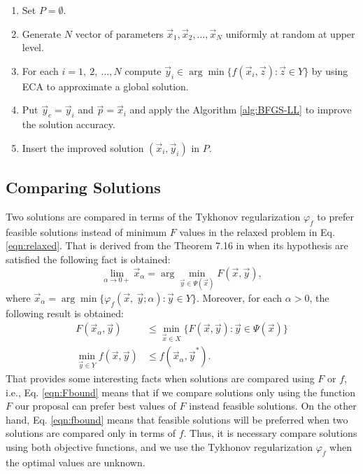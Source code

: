 \documentclass[conference]{IEEEtran}
\theoremstyle{definition}
\begin{document}
\begin{enumerate}
    \item Set $P = \emptyset $.
    \item Generate $N$ vector of parameters $\vec{x}_1, \vec{x}_2, \ldots, \vec{x}_N$
          uniformly at random at upper level.
    \item For each $i=1,\ 2,\ \ldots,N$ compute
            $\vec{y}_i \in \arg \min \{ f(\vec{x}_i, \vec{z}) : \vec{z} \in Y \}$
          by using ECA to approximate a global solution.
    \item Put $\vec{y}_c = \vec{y}_i$ and $\vec{p} = \vec{x}_i$ and apply the
          Algorithm \ref{alg:BFGS-LL} to improve the solution accuracy.
    \item Insert the improved solution $(\vec{x}_i, \vec{y}_i)$ in $P$.
\end{enumerate}

\subsection{Comparing Solutions} %
\label{sub:comparing_solutions}

Two solutions are compared in terms of the Tykhonov regularization $\varphi_f$
to prefer feasible solutions instead of minimum $F$ values in the relaxed problem
in Eq. \ref{eqn:relaxed}. That is derived from the Theorem 7.16 in \cite{dempe2002foundations}
when its hypothesis are satisfied the following fact is obtained:
% 
\[
    \lim_{\alpha \to 0+} \vec{x}_\alpha = \arg \min_{\vec{y} \in \Psi(\vec{x})} F(\vec{x}, \vec{y}),
\]
%
where $\vec{x}_\alpha = \arg \min\{\varphi_f (\vec{x},\ \vec{y}; \alpha) : \vec{y} \in Y\} $.
Moreover, for each $\alpha > 0$, the following result is obtained:
% 
\begin{align}
    \label{eqn:Fbound}
    F(\vec{x}_\alpha, \vec{y}) &\leq \min_{ \vec{x} \in X} \{ F(\vec{x}, \vec{y}) : \vec{y} \in \Psi(\vec{x}) \} \\
    \label{eqn:fbound}
    \min_{\vec{y} \in Y } f(\vec{x}, \vec{y}) &\leq f(\vec{x}_\alpha, \vec{y}^*).
\end{align}
% 
That provides some interesting facts when solutions are compared using $F$ or $f$,
i.e.,  Eq. \ref{eqn:Fbound} means that if we compare solutions only using the
function $F$ our proposal can prefer best values of $F$ instead feasible solutions.
On the other hand, Eq. \ref{eqn:fbound} means that feasible solutions will be
preferred when two solutions are compared only in  terms of $f$. Thus, it is
necessary compare solutions using both objective functions, and we use the Tykhonov
regularization $\varphi_f$ when the optimal values are unknown.
\end{document}
